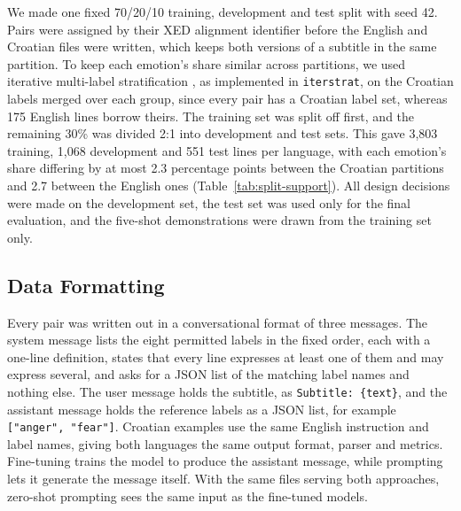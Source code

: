 We made one fixed 70/20/10 training, development and test split with seed 42. Pairs were assigned by their XED alignment identifier before the English and Croatian files were written, which keeps both versions of a subtitle in the same partition. To keep each emotion's share similar across partitions, we used iterative multi-label stratification \parencite{sechidis2011stratification}, as implemented in \texttt{iterstrat}, on the Croatian labels merged over each group, since every pair has a Croatian label set, whereas 175 English lines borrow theirs. The training set was split off first, and the remaining 30\% was divided 2:1 into development and test sets. This gave 3,803 training, 1,068 development and 551 test lines per language, with each emotion's share differing by at most 2.3 percentage points between the Croatian partitions and 2.7 between the English ones (Table~\ref{tab:split-support}). All design decisions were made on the development set, the test set was used only for the final evaluation, and the five-shot demonstrations were drawn from the training set only.

\subsection{Data Formatting}
\label{sec:data_formatting}

Every pair was written out in a conversational format of three messages. The system message lists the eight permitted labels in the fixed order, each with a one-line definition, states that every line expresses at least one of them and may express several, and asks for a JSON list of the matching label names and nothing else. The user message holds the subtitle, as \texttt{Subtitle: \{text\}}, and the assistant message holds the reference labels as a JSON list, for example \texttt{["anger", "fear"]}. Croatian examples use the same English instruction and label names, giving both languages the same output format, parser and metrics. Fine-tuning trains the model to produce the assistant message, while prompting lets it generate the message itself. With the same files serving both approaches, zero-shot prompting sees the same input as the fine-tuned models.
